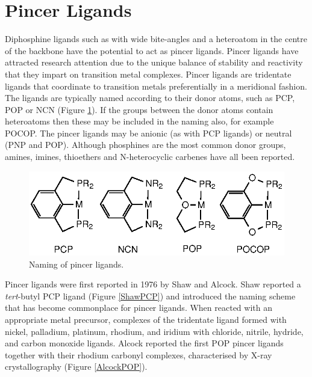 \section{Pincer Ligands}

Diphosphine ligands such as \Phxantphos{} with wide bite-angles and a heteroatom in the centre of the backbone have the potential to act as pincer ligands.  Pincer ligands have attracted research attention due to the unique balance of stability and reactivity that they impart on transition metal complexes.\cite{Becerra2009}  Pincer ligands are tridentate ligands that coordinate to transition metals preferentially in a meridional fashion.\cite{Choi2011}   The ligands are typically named according to their donor atoms, such as PCP, POP or NCN (Figure \ref{Pincernaming}).  If the groups between the donor atoms contain heteroatoms then these may be included in the naming also, for example POCOP.  The pincer ligands may be anionic (as with PCP ligands) or neutral (PNP and POP).\cite{Vlugt2009, Kataoka1995}  Although phosphines are the most common donor groups, amines,\cite{Singleton2003} imines,\cite{Takenaka2005} thioethers\cite{Zim2000} and N-heterocyclic carbenes\cite{Hahn2007} have all been reported.

\begin{figure}[ht]
\centering
\includegraphics[]{../Figures/Pincernaming.eps}
\caption[Naming of pincer ligands]{Naming of pincer ligands.}
\label{Pincernaming}
\end{figure}

Pincer ligands were first reported in 1976 by Shaw and Alcock.\cite{Moulton1976, Alcock1976}  Shaw reported a \emph{tert}-butyl PCP ligand (Figure \ref{ShawPCP}) and introduced the naming scheme that has become commonplace for pincer ligands.  When reacted with an appropriate metal precursor, complexes of the tridentate ligand formed with nickel, palladium, platinum, rhodium, and iridium with chloride, nitrile, hydride, and carbon monoxide ligands.\cite{Moulton1976}  Alcock reported the first POP pincer ligands together with their rhodium carbonyl complexes, characterised by X-ray crystallography (Figure \ref{AlcockPOP}).\cite{Alcock1976}  

